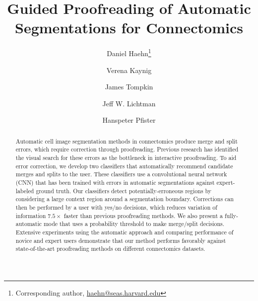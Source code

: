 \documentclass[10pt,twocolumn,letterpaper]{article}
\begin{document}
\title{Guided Proofreading of Automatic Segmentations for Connectomics}




\author[1]{Daniel Haehn\thanks{Corresponding author,  \url{haehn@seas.harvard.edu}}}
\author[1]{Verena Kaynig}
\author[2]{James Tompkin}
\author[1]{Jeff W. Lichtman}
\author[1]{Hanspeter Pfister}

\maketitle

\begin{abstract}
%
Automatic cell image segmentation methods in connectomics produce merge and
split errors, which require correction through proofreading. Previous research
has identified the visual search for these errors as the bottleneck in
interactive proofreading. To aid error correction, we develop two classifiers
that automatically recommend candidate merges and splits to the user. These
classifiers use a convolutional neural network (CNN) that has been trained with
errors in automatic segmentations against expert-labeled ground truth. Our
classifiers detect potentially-erroneous regions by considering a large context
region around a segmentation boundary. Corrections can then be performed by a
user with yes/no decisions, which reduces variation of information $7.5\times$ faster than previous
proofreading methods. We also present a fully-automatic mode that uses a
probability threshold to make merge/split decisions. Extensive experiments using
the automatic approach and comparing performance of novice and expert users
demonstrate that our method performs favorably against state-of-the-art
proofreading methods on different connectomics datasets.
%
\vspace{-4mm}
\end{abstract}
\end{document}
